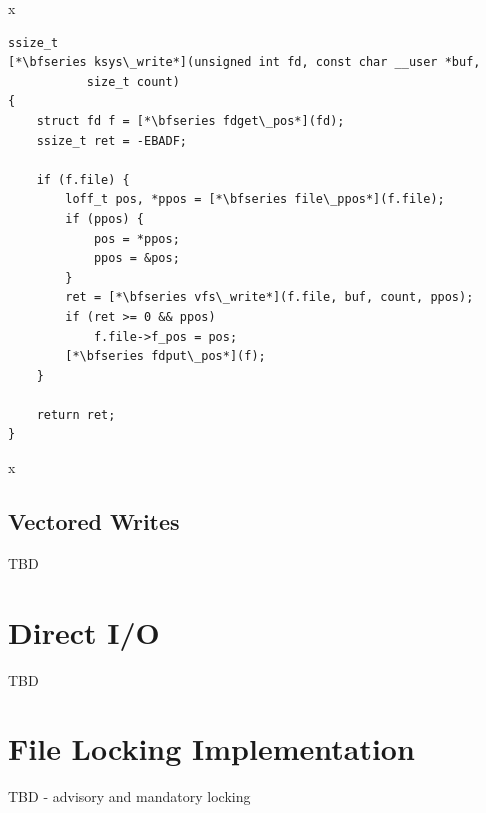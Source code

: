 \noindent
x

\begin{lstlisting}
ssize_t 
[*\bfseries ksys\_write*](unsigned int fd, const char __user *buf, 
           size_t count)
{
    struct fd f = [*\bfseries fdget\_pos*](fd);
    ssize_t ret = -EBADF;

    if (f.file) {
        loff_t pos, *ppos = [*\bfseries file\_ppos*](f.file);
        if (ppos) {
            pos = *ppos;
            ppos = &pos;
        }
        ret = [*\bfseries vfs\_write*](f.file, buf, count, ppos);
        if (ret >= 0 && ppos)
            f.file->f_pos = pos;
        [*\bfseries fdput\_pos*](f);
    }

    return ret;
}
\end{lstlisting}

\noindent
x


\subsection{Vectored Writes}

TBD


\section{Direct I/O}\label{kernel-direct-io}

TBD



\section{File Locking Implementation}

TBD - advisory and mandatory locking




